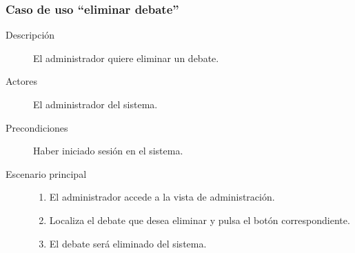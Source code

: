 \subsubsection{Caso de uso ``eliminar debate''}
\begin{description}
\item[Descripción] El administrador quiere eliminar un debate.
\item[Actores] El administrador del sistema.
\item[Precondiciones] Haber iniciado sesión en el sistema.
\item[Escenario principal] \hfill
						 	\begin{enumerate}
							\item El administrador accede a la vista de administración.
							\item Localiza el debate que desea eliminar y pulsa el botón correspondiente.
							\item El debate será eliminado del sistema.
							\end{enumerate}
\end{description}